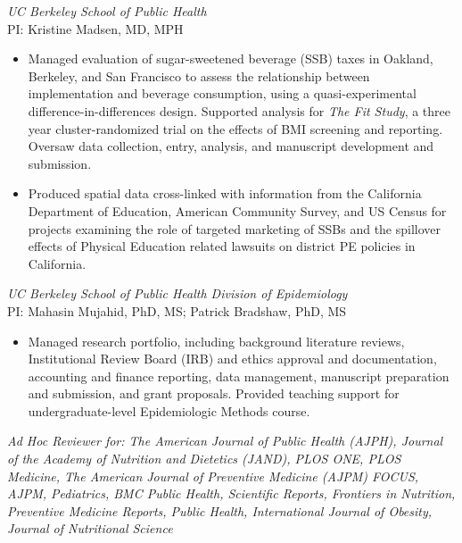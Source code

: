 \documentclass{cv_style}
\begin{document}
\textit{UC Berkeley School of Public Health} \\
PI: Kristine Madsen, MD, MPH
\begin{itemize}
    \item Managed evaluation of sugar-sweetened beverage (SSB) taxes in Oakland, Berkeley, and San Francisco to assess the relationship between implementation and beverage consumption, using a quasi-experimental difference-in-differences design. Supported analysis for \textit{The Fit Study}, a three year cluster-randomized trial on the effects of BMI screening and reporting. Oversaw data collection, entry, analysis, and manuscript development and submission.
    \item \parskip 1pt Produced spatial data cross-linked with information from the California Department of Education, American Community Survey, and US Census for projects examining the role of targeted marketing of SSBs and the spillover effects of Physical Education related lawsuits on district PE policies in California.
\end{itemize}

\textit{UC Berkeley School of Public Health Division of Epidemiology} \\
PI: Mahasin Mujahid, PhD, MS; Patrick Bradshaw, PhD, MS
\begin{itemize}
    \item Managed research portfolio, including background literature reviews, Institutional Review Board (IRB) and ethics approval and documentation, accounting and finance reporting, data management, manuscript preparation and submission, and grant proposals. Provided teaching support for undergraduate-level Epidemiologic Methods course.
\end{itemize}


\parskip -5pt 
\nocite{*}
\printbibliography[title=Publications]

\vspace{2em}

\textit{Ad Hoc Reviewer for: The American Journal of Public Health (AJPH), Journal of the Academy of Nutrition and Dietetics (JAND), PLOS ONE, PLOS Medicine, The American Journal of Preventive Medicine (AJPM) FOCUS, AJPM, Pediatrics, BMC Public Health, Scientific Reports, Frontiers in Nutrition, Preventive Medicine Reports, Public Health, International Journal of Obesity, Journal of Nutritional Science}
\end{document}
